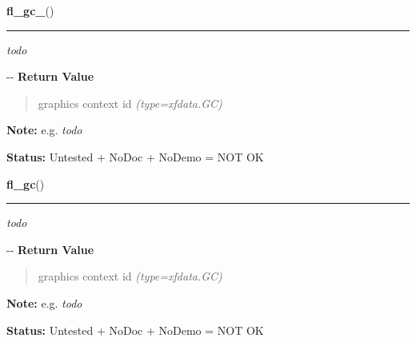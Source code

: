     \label{xformslib:flmisc:fl_gc_}

    \vspace{0.5ex}

\hspace{.8\funcindent}\begin{boxedminipage}{\funcwidth}

    \raggedright \textbf{fl\_gc\_}()

    \vspace{-1.5ex}

    \rule{\textwidth}{0.5\fboxrule}
\setlength{\parskip}{2ex}

\emph{todo}

-{}-
\setlength{\parskip}{1ex}
      \textbf{Return Value}
    \vspace{-1ex}

      \begin{quote}

graphics context id
      {\it (type=xfdata.GC)}

      \end{quote}

\textbf{Note:} 
e.g. \emph{todo}


\textbf{Status:} 
Untested + NoDoc + NoDemo = NOT OK


    \end{boxedminipage}

    \label{xformslib:flmisc:fl_gc_}

    \vspace{0.5ex}

\hspace{.8\funcindent}\begin{boxedminipage}{\funcwidth}

    \raggedright \textbf{fl\_gc}()

    \vspace{-1.5ex}

    \rule{\textwidth}{0.5\fboxrule}
\setlength{\parskip}{2ex}

\emph{todo}

-{}-
\setlength{\parskip}{1ex}
      \textbf{Return Value}
    \vspace{-1ex}

      \begin{quote}

graphics context id
      {\it (type=xfdata.GC)}

      \end{quote}

\textbf{Note:} 
e.g. \emph{todo}


\textbf{Status:} 
Untested + NoDoc + NoDemo = NOT OK


    \end{boxedminipage}

